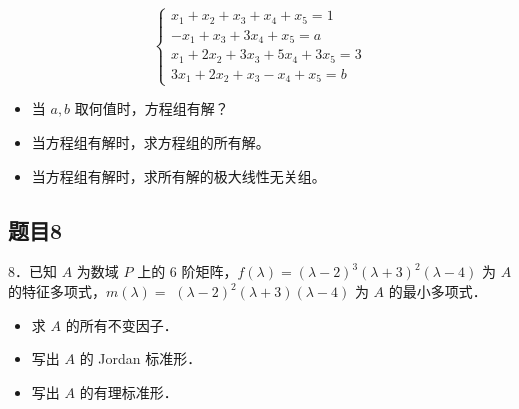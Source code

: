 \documentclass{article}
\begin{document}
\[
\left\{\begin{array}{l}
x_{1}+x_{2}+x_{3}+x_{4}+x_{5}=1 \\
-x_{1}+x_{3}+3 x_{4}+x_{5}=a \\
x_{1}+2 x_{2}+3 x_{3}+5 x_{4}+3 x_{5}=3 \\
3 x_{1}+2 x_{2}+x_{3}-x_{4}+x_{5}=b
\end{array}\right.
\]

\begin{itemize}
  \item[（1）] 当 \(a, b\) 取何值时，方程组有解？
  \item[（2）] 当方程组有解时，求方程组的所有解。
  \item[（3）] 当方程组有解时，求所有解的极大线性无关组。
\end{itemize}

\subsection{题目8}
8．已知 \(A\) 为数域 \(P\) 上的 6 阶矩阵，\(f(\lambda)=(\lambda-2)^{3}(\lambda+3)^{2}(\lambda-4)\) 为 \(A\) 的特征多项式，\(m(\lambda)=\) \((\lambda-2)^{2}(\lambda+3)(\lambda-4)\) 为 \(A\) 的最小多项式．

\begin{itemize}
  \item[（1）] 求 \(A\) 的所有不变因子．
  \item[（2）] 写出 \(A\) 的 Jordan 标准形．
  \item[（3）] 写出 \(A\) 的有理标准形．
\end{itemize}
\end{document}
